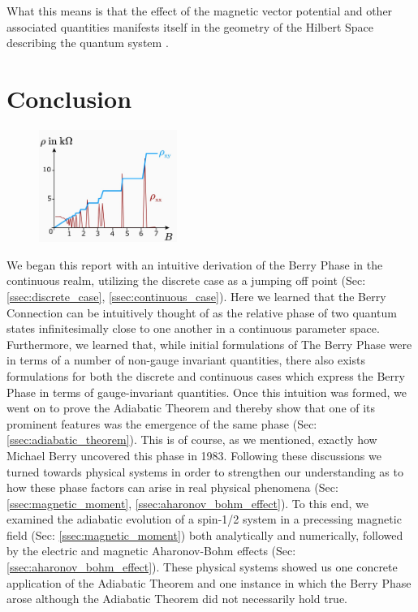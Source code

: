 \documentclass{article}
\begin{document}
    What this means is that the effect of the magnetic vector potential and other associated quantities manifests itself in the geometry of the Hilbert Space describing the quantum system \cite{Cohen2019}.

\section{Conclusion}\label{sec:conclusion}

  \begin{figure}
    \includegraphics[width=0.4\textwidth]{quantum_hall}
  \end{figure}

We began this report with an intuitive derivation of the Berry Phase in the continuous realm, utilizing the discrete case as a jumping off point (Sec: \ref{ssec:discrete_case}, \ref{ssec:continuous_case}). Here we learned that the Berry Connection can be intuitively thought of as the relative phase of two quantum states infinitesimally close to one another in a continuous parameter space. Furthermore, we learned that, while initial formulations of The Berry Phase were in terms of a number of non-gauge invariant quantities, there also exists formulations for both the discrete and continuous cases which express the Berry Phase in terms of gauge-invariant quantities. Once this intuition was formed, we went on to prove the Adiabatic Theorem and thereby show that one of its prominent features was the emergence of the same phase (Sec: \ref{ssec:adiabatic_theorem}). This is of course, as we mentioned, exactly how Michael Berry uncovered this phase in 1983. Following these discussions we turned towards physical systems in order to strengthen our understanding as to how these phase factors can arise in real physical phenomena (Sec: \ref{ssec:magnetic_moment}, \ref{ssec:aharonov_bohm_effect}). To this end, we examined the adiabatic evolution of a spin-1/2 system in a precessing magnetic field (Sec: \ref{ssec:magnetic_moment}) both analytically and numerically, followed by the electric and magnetic Aharonov-Bohm effects (Sec: \ref{ssec:aharonov_bohm_effect}). These physical systems showed us one concrete application of the Adiabatic Theorem and one instance in which the Berry Phase arose although the Adiabatic Theorem did not necessarily hold true.\\
\end{document}
